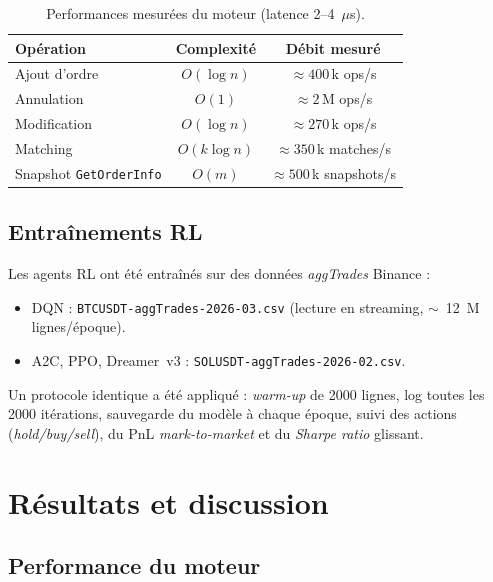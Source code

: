 \documentclass[11pt,a4paper]{article}
\begin{document}
\begin{table}[H]
    \centering
    \begin{tabular}{lcc}
        \toprule
        \textbf{Opération} & \textbf{Complexité} & \textbf{Débit mesuré} \\
        \midrule
        Ajout d'ordre        & $O(\log n)$   & $\approx 400\,$k ops/s \\
        Annulation           & $O(1)$        & $\approx 2\,$M ops/s   \\
        Modification         & $O(\log n)$   & $\approx 270\,$k ops/s \\
        Matching             & $O(k\log n)$  & $\approx 350\,$k matches/s \\
        Snapshot \texttt{GetOrderInfo} & $O(m)$ & $\approx 500\,$k snapshots/s \\
        \bottomrule
    \end{tabular}
    \caption{Performances mesurées du moteur (latence 2--4~$\mu$s).}
    \label{tab:bench}
\end{table}

\subsection{Entraînements RL}

Les agents RL ont été entraînés sur des données
\textit{aggTrades} Binance :
\begin{itemize}[leftmargin=1.2cm]
    \item DQN : \texttt{BTCUSDT-aggTrades-2026-03.csv}
          (lecture en streaming, $\sim$~12~M lignes/époque).
    \item A2C, PPO, Dreamer~v3 :
          \texttt{SOLUSDT-aggTrades-2026-02.csv}.
\end{itemize}

Un protocole identique a été appliqué :
\textit{warm-up} de 2000 lignes, log toutes les 2000
itérations, sauvegarde du modèle à chaque époque,
suivi des actions (\textit{hold/buy/sell}), du PnL
\textit{mark-to-market} et du \textit{Sharpe ratio}
glissant.

\section{Résultats et discussion}
\label{sec:resultats}

\subsection{Performance du moteur}
\end{document}
